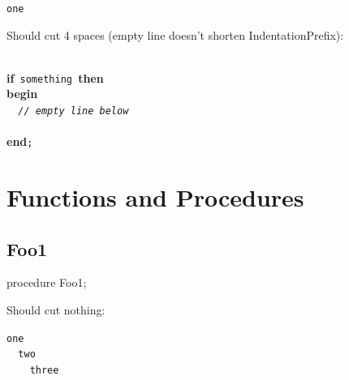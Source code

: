 \documentclass{report}
\newif\ifpdf
\begin{document}
\begin{description}
\texttt{\\\nopagebreak[3]
~~~~~~~~~~~~~~~~~\\\nopagebreak[3]
~~~~~~~~~~~~~~~~~~\\\nopagebreak[3]
one\\
}
\item[\texttt{Foo7}]Should cut 4 spaces (empty line doesn't shorten IndentationPrefix):

\texttt{\\\nopagebreak[3]
}\textbf{if}\texttt{~something~}\textbf{then}\texttt{\\\nopagebreak[3]
}\textbf{begin}\texttt{\\\nopagebreak[3]
~~\textit{//~empty~line~below}\\\nopagebreak[3]
\\\nopagebreak[3]
}\textbf{end}\texttt{;\\
}
\end{description}
\section{Functions and Procedures}
\ifpdf
\subsection*{\large{\textbf{Foo1}}\normalsize\hspace{1ex}\hrulefill}
\else
\subsection*{Foo1}
\fi
\label{ok_longcode_indentation-Foo1}
\begin{list}{}{
\setlength{\itemindent}{0cm}
\setlength{\listparindent}{0cm}
\setlength{\leftmargin}{\evensidemargin}
\addtolength{\leftmargin}{\tmplength}
\settowidth{\labelsep}{X}
\addtolength{\leftmargin}{\labelsep}
\setlength{\labelwidth}{\tmplength}
}
\item[\textbf{Declaration}\hfill]
\ifpdf
\begin{flushleft}
\fi
\begin{ttfamily}
procedure Foo1;\end{ttfamily}

\ifpdf
\end{flushleft}
\fi

\par
\item[\textbf{Description}]
Should cut nothing:

\texttt{one\\\nopagebreak[3]
~~two\\\nopagebreak[3]
~~~~three\\
}

\end{list}
\ifpdf
\end{document}
